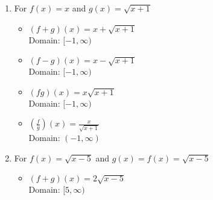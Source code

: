 \begin{enumerate}
\begin{multicols}{2}
\begin{itemize}
\end{itemize}

\end{multicols}


\item For   $f(x) =x$ and $g(x) = \sqrt{x+1}$

\begin{multicols}{2}

\begin{itemize}

\item $(f+g)(x) = x+\sqrt{x+1}$ \\
      Domain: $[-1,\infty)$
      
      \vfill
      
      \columnbreak
      
\item $(f-g)(x) = x-\sqrt{x+1}$ \\
       Domain: $[-1,\infty)$


\end{itemize}

\end{multicols}

\begin{multicols}{2}

\begin{itemize}

\item $(fg)(x) = x\sqrt{x+1}$ \\
       Domain: $[-1,\infty)$
      
      \vfill
      
      \columnbreak
      
\item $\left(\frac{f}{g}\right)(x) =\frac{x}{\sqrt{x+1}}$ \\
       Domain: $(-1,\infty)$


\end{itemize}

\end{multicols}

\item For   $f(x) = \sqrt{x-5}$ and $g(x) = f(x) = \sqrt{x-5}$

\begin{multicols}{2}

\begin{itemize}

\item $(f+g)(x) = 2\sqrt{x-5}$ \\
      Domain: $[5,\infty)$
      

\end{itemize}
\end{multicols}
\end{enumerate}
